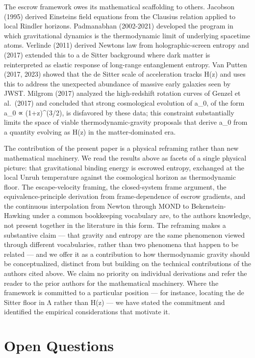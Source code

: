 \documentclass[11pt]{article}
\begin{document}
The escrow framework owes its mathematical scaffolding to others. Jacobson (1995) derived Einstein\textquotesingle s field equations from the Clausius relation applied to local Rindler horizons. Padmanabhan (2002-2021) developed the program in which gravitational dynamics is the thermodynamic limit of underlying spacetime atoms. Verlinde (2011) derived Newton\textquotesingle s law from holographic-screen entropy and (2017) extended this to a de Sitter background where dark matter is reinterpreted as elastic response of long-range entanglement entropy. Van Putten (2017, 2023) showed that the de Sitter scale of acceleration tracks H(z) and uses this to address the unexpected abundance of massive early galaxies seen by JWST. Milgrom (2017) analyzed the high-redshift rotation curves of Genzel et al.~(2017) and concluded that strong cosmological evolution of a\_0, of the form a\_0 ∝ (1+z)\^{}(3/2), is disfavored by these data; this constraint substantially limits the space of viable thermodynamic-gravity proposals that derive a\_0 from a quantity evolving as H(z) in the matter-dominated era.

The contribution of the present paper is a physical reframing rather than new mathematical machinery. We read the results above as facets of a single physical picture: that gravitational binding energy is escrowed entropy, exchanged at the local Unruh temperature against the cosmological horizon as thermodynamic floor. The escape-velocity framing, the closed-system frame argument, the equivalence-principle derivation from frame-dependence of escrow gradients, and the continuous interpolation from Newton through MOND to Bekenstein-Hawking under a common bookkeeping vocabulary are, to the author\textquotesingle s knowledge, not present together in the literature in this form. The reframing makes a substantive claim --- that gravity and entropy are the same phenomenon viewed through different vocabularies, rather than two phenomena that happen to be related --- and we offer it as a contribution to how thermodynamic gravity should be conceptualized, distinct from but building on the technical contributions of the authors cited above. We claim no priority on individual derivations and refer the reader to the prior authors for the mathematical machinery. Where the framework is committed to a particular position --- for instance, locating the de Sitter floor in Λ rather than H(z) --- we have stated the commitment and identified the empirical considerations that motivate it.

\section{Open Questions}\label{open-questions}
\end{document}
